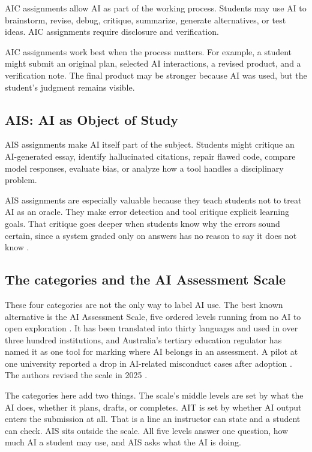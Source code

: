 \documentclass{SIAMbook2023}
\newcommand{\AIS}{\textcolor{catAIS}{\textbf{AIS}}}
\begin{document}
AIC assignments allow AI as part of the working process. Students may use AI to brainstorm, revise, debug, critique, summarize, generate alternatives, or test ideas. AIC assignments require disclosure and verification.

AIC assignments work best when the process matters. For example, a student might submit an original plan, selected AI interactions, a revised product, and a verification note. The final product may be stronger because AI was used, but the student's judgment remains visible.

\subsection{\texorpdfstring{\AIS{}: AI as Object of Study}{AIS: AI as Object of Study}}
\label{i:subsec:blue}

AIS assignments make AI itself part of the subject. Students might critique an AI-generated essay, identify hallucinated citations, repair flawed code, compare model responses, evaluate bias, or analyze how a tool handles a disciplinary problem.

AIS assignments are especially valuable because they teach students not to treat AI as an oracle. They make error detection and tool critique explicit learning goals. That critique goes deeper when students know why the errors sound certain, since a system graded only on answers has no reason to say it does not know \citep{kalai2025hallucinate}.

\subsection{The categories and the AI Assessment Scale}
\label{i:subsec:aias-crosswalk}%

These four categories are not the only way to label AI use. The best known alternative is the AI Assessment Scale, five ordered levels running from no AI to open exploration \citep{perkins2024aias}. It has been translated into thirty languages and used in over three hundred institutions, and Australia's tertiary education regulator has named it as one tool for marking where AI belongs in an assessment. A pilot at one university reported a drop in AI-related misconduct cases after adoption \citep{furze2024aias}. The authors revised the scale in 2025 \citep{perkins2025reimagining}.

The categories here add two things. The scale's middle levels are set by what the AI does, whether it plans, drafts, or completes. AIT is set by whether AI output enters the submission at all. That is a line an instructor can state and a student can check. AIS sits outside the scale. All five levels answer one question, how much AI a student may use, and AIS asks what the AI is doing.
\end{document}
